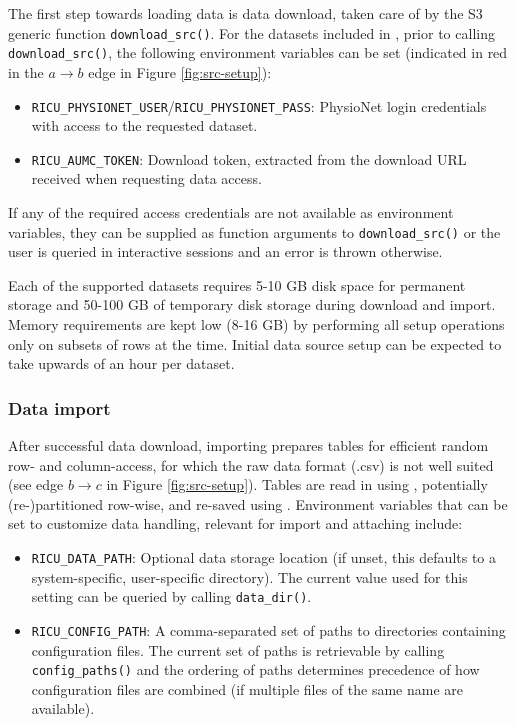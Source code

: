 \documentclass[
  notitle]{jss}
\providecommand{\tightlist}{%
  \setlength{\itemsep}{0pt}\setlength{\parskip}{0pt}}
\begin{document}
The first step towards loading data is data download, taken care of by
the S3 generic function \texttt{download\_src()}. For the datasets
included in , prior to calling \texttt{download\_src()}, the
following environment variables can be set (indicated in red in the
\(a \to b\) edge in Figure \ref{fig:src-setup}):

\begin{itemize}
\tightlist
\item
  \texttt{RICU\_PHYSIONET\_USER}/\texttt{RICU\_PHYSIONET\_PASS}:
  PhysioNet login credentials with access to the requested dataset.
\item
  \texttt{RICU\_AUMC\_TOKEN}: Download token, extracted from the
  download URL received when requesting data access.
\end{itemize}

If any of the required access credentials are not available as
environment variables, they can be supplied as function arguments to
\texttt{download\_src()} or the user is queried in interactive sessions
and an error is thrown otherwise.

Each of the supported datasets requires 5-10 GB disk space for permanent
storage and 50-100 GB of temporary disk storage during download and
import. Memory requirements are kept low (8-16 GB) by performing all
setup operations only on subsets of rows at the time. Initial data
source setup can be expected to take upwards of an hour per dataset.

\hypertarget{data-import}{%
\subsubsection{Data import}\label{data-import}}

After successful data download, importing prepares tables for efficient
random row- and column-access, for which the raw data format (.csv) is
not well suited (see edge \(b \to c\) in Figure \ref{fig:src-setup}).
Tables are read in using  \citep{hester2020}, potentially
(re-)partitioned row-wise, and re-saved using . Environment
variables that can be set to customize  data handling,
relevant for import and attaching include:

\begin{itemize}
\tightlist
\item
  \texttt{RICU\_DATA\_PATH}: Optional data storage location (if unset,
  this defaults to a system-specific, user-specific directory). The
  current value used for this setting can be queried by calling
  \texttt{data\_dir()}.
\item
  \texttt{RICU\_CONFIG\_PATH}: A comma-separated set of paths to
  directories containing configuration files. The current set of paths
  is retrievable by calling \texttt{config\_paths()} and the ordering of
  paths determines precedence of how configuration files are combined
  (if multiple files of the same name are available).
\end{itemize}
\end{document}
